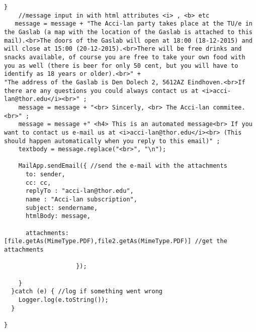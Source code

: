 \documentclass{article}
\begin{document}
\begin{lstlisting}[caption = Google Form emailer ]
    }
    //message input in with html attributes <i> , <b> etc 
   message = message + "The Acci-lan party takes place at the TU/e in the Gaslab (a map with the location of the Gaslab is attached to this mail).<br>The doors of the Gaslab will open at 18:00 (18-12-2015) and will close at 15:00 (20-12-2015).<br>There will be free drinks and snacks available, of course you are free to take your own food with you as well (there is beer for only 50 cent, but you will have to identify as 18 years or older).<br>" + 
"The address of the Gaslab is Den Dolech 2, 5612AZ Eindhoven.<br>If there are any questions you could always contact us at <i>acci-lan@thor.edu</i><br>" ;
    message = message + "<br> Sincerly, <br> The Acci-lan commitee.<br>" ;
    message = message +" <h4> This is an automated message<br> If you want to contact us e-mail us at <i>acci-lan@thor.edu</i><br> (This should happen automatically when you reply to this email)" ;
    textbody = message.replace("<br>", "\n");
    
    MailApp.sendEmail({ //send the e-mail with the attachments
      to: sender,
      cc: cc,
      replyTo : "acci-lan@thor.edu",
      name : "Acci-lan subscription",
      subject: sendername, 
      htmlBody: message, 
     
      attachments: [file.getAs(MimeType.PDF),file2.getAs(MimeType.PDF)] //get the attachments 
      
                    });
    
    }
  }catch (e) { //log if something went wrong
    Logger.log(e.toString());
  }
 
}
\end{lstlisting}
\end{document}
